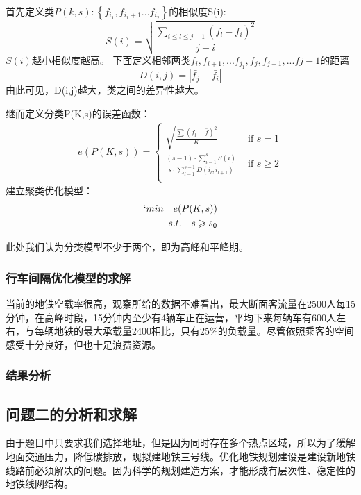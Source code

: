 \documentclass[12pt,a4paper]{mcmthesis}
\begin{document}
首先定义类$P(k,s):\left \{ {f_{i_1},f_{i_1+1}...f_{i_2}} \right \}$的相似度S(i):
\begin{equation}
	S(i)=\sqrt{\frac{\sum_{i\leq l\leq{j-1} }\left ( f_l-\bar{f_i} \right )^2}{j-i}}
\end{equation}
$S(i)$越小相似度越高。
下面定义相邻两类${f_i,f_{i+1},...f_{j_1}},{f_j,f_{j+1},...f{j-1}}的距离$
\begin{equation}
	D(i,j)=\left | \bar{f_j}-\bar{f_i} \right |
\end{equation}
由此可见，D(i,j)越大，类之间的差异性越大。

继而定义分类P(K,s)的误差函数：
\begin{equation}
	\begin{aligned}
	e(P(K,s))=
	\begin{cases}
		\sqrt{\frac{\sum (f_l-\bar f)^2}{K}} & \text{ if } s=1 \\ 
		\frac{(s-1)\cdot \sum_{i=1}^{s}S(i)}{s\cdot \sum_{l=1}^{s-1}D(i_l,i_{l+1})}& \text{ if } s\geq 2 \\ 
	\end{cases}
    \end{aligned}
\end{equation}
建立聚类优化模型：
\begin{equation}
	\begin{aligned}`
		min \quad e(P(K,s))\\
		s.t. \quad s \geqslant s_0
	\end{aligned}
\end{equation}

此处我们认为分类模型不少于两个，即为高峰和平峰期。

\subsubsection{行车间隔优化模型的求解}
当前的地铁空载率很高，观察所给的数据不难看出，最大断面客流量在2500人每15分钟，在高峰时段，15分钟内至少有4辆车正在运营，平均下来每辆车有600人左右，与每辆地铁的最大承载量2400相比，只有25\%的负载量。尽管依照乘客的空间感受十分良好，但也十足浪费资源。

\subsubsection{结果分析}

\subsection{问题二的分析和求解}
由于题目中只要求我们选择地址，但是因为同时存在多个热点区域，所以为了缓解地面交通压力，降低碳排放，现拟建地铁三号线。优化地铁规划建设是建设新地铁线路前必须解决的问题。因为科学的规划建造方案，才能形成有层次性、稳定性的地铁线网结构。
\end{document}
